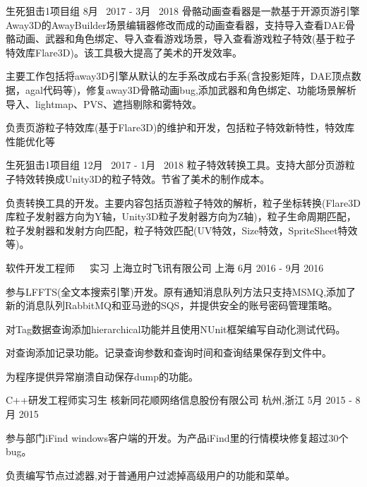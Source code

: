 \begin{cventries}
\cventryproject
{生死狙击1项目组} %
{8月~ 2017 - 3月~ 2018} %
{骨骼动画查看器是一款基于开源页游引擎Away3D的AwayBuilder场景编辑器修改而成的动画查看器，支持导入查看DAE骨骼动画、武器和角色绑定、导入查看游戏场景，导入查看游戏粒子特效(基于粒子特效库Flare3D)。该工具极大提高了美术的开发效率。}
{ %
	\begin{cvitems}
		\item {主要工作包括将away3D引擎从默认的左手系改成右手系(含投影矩阵，DAE顶点数据，agal代码等)，修复away3D骨骼动画bug,添加武器和角色绑定、功能场景解析导入、lightmap、PVS、遮挡剔除和雾特效。}
		\item {负责页游粒子特效库(基于Flare3D)的维护和开发，包括粒子特效新特性，特效库性能优化等}
	\end{cvitems}
}
\cventryproject
{生死狙击1项目组} %
{12月~ 2017 - 1月~ 2018} %
{粒子特效转换工具。支持大部分页游粒子特效转换成Unity3D的粒子特效。节省了美术的制作成本。}
{ %
	\begin{cvitems}
		\item {负责转换工具的开发。主要内容包括页游粒子特效的解析，粒子坐标转换(Flare3D库粒子发射器方向为Y轴，Unity3D粒子发射器方向为Z轴)，粒子生命周期匹配，粒子发射器和发射方向匹配，粒子特效匹配(UV特效，Size特效，SpriteSheet特效等)。}
	\end{cvitems}
}
\cventry
{软件开发工程师~~~实习} %
{上海立时飞讯有限公司} %
{上海} %
{6月 2016 - 9月 2016} %
{ %
\begin{cvitems}
\item {参与LFFTS(全文本搜索引擎)开发。原有通知消息队列方法只支持MSMQ,添加了新的消息队列RabbitMQ和亚马逊的SQS，并提供安全的账号密码管理策略。}
\item {对Tag数据查询添加hierarchical功能并且使用NUnit框架编写自动化测试代码。}
\item {对查询添加记录功能。记录查询参数和查询时间和查询结果保存到文件中。}
\item {为程序提供异常崩溃自动保存dump的功能。}
\end{cvitems}
}


\cventry
{C++研发工程师实习生} %
{核新同花顺网络信息股份有限公司} %
{杭州,浙江} %
{5月 2015 - 8月 2015} %
{ %
\begin{cvitems}
\item {参与部门iFind windows客户端的开发。为产品iFind里的行情模块修复超过30个bug。}
\item {负责编写节点过滤器,对于普通用户过滤掉高级用户的功能和菜单。}
\end{cvitems} 
}

\end{cventries}

